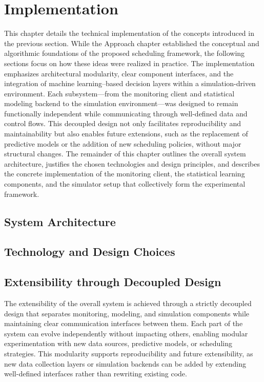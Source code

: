 \section{Implementation}
\label{cha:implementation}
This chapter details the technical implementation of the concepts introduced in the previous section. While the Approach chapter established the conceptual and algorithmic foundations of the proposed scheduling framework, the following sections focus on how these ideas were realized in practice. The implementation emphasizes architectural modularity, clear component interfaces, and the integration of machine learning–based decision layers within a simulation-driven environment. Each subsystem—from the monitoring client and statistical modeling backend to the simulation environment—was designed to remain functionally independent while communicating through well-defined data and control flows. This decoupled design not only facilitates reproducibility and maintainability but also enables future extensions, such as the replacement of predictive models or the addition of new scheduling policies, without major structural changes. The remainder of this chapter outlines the overall system architecture, justifies the chosen technologies and design principles, and describes the concrete implementation of the monitoring client, the statistical learning components, and the simulator setup that collectively form the experimental framework.

\subsection{System Architecture}
\label{sec:system_architecture}

\subsection{Technology and Design Choices}
\label{sec:technology_and_design_choices}

\subsection{Extensibility through Decoupled Design}
\label{sec:extensibility_through_decoupled_design}
The extensibility of the overall system is achieved through a strictly decoupled design that separates monitoring, modeling, and simulation components while maintaining clear communication interfaces between them. Each part of the system can evolve independently without impacting others, enabling modular experimentation with new data sources, predictive models, or scheduling strategies. This modularity supports reproducibility and future extensibility, as new data collection layers or simulation backends can be added by extending well-defined interfaces rather than rewriting existing code.
